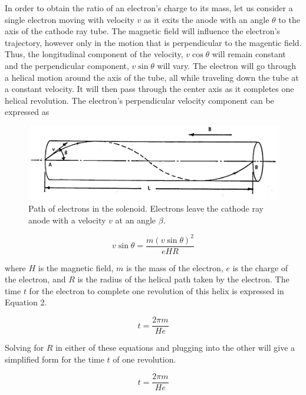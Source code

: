 \documentclass[%
 aip,
 amsmath,amssymb,
 reprint,%
floatfix,
]{revtex4-1}
\begin{document}
In order to obtain the ratio of an electron's charge to its mass, let us consider a single electron moving with velocity $v$ as it exits the anode with an angle $\theta$ to the axis of the cathode ray tube. The magnetic field will influence the electron's trajectory, however only in the motion that is perpendicular to the magentic field. Thus, the longitudinal component of the velocity, $v \cos{\theta}$ will remain constant and the perpendicular component, $v \sin{\theta}$ will vary. The electron will go through a helical motion around the axis of the tube, all while traveling down the tube at a constant velocity. It will then pass through the center axis as it completes one helical revolution. The electron's perpendicular velocity component can be expressed as

\begin{figure}[H]
		\centering
		\includegraphics[scale=0.5]{electrontrajectory.png}
		\caption{Path of electrons in the solenoid. Electrons leave the cathode ray anode with a velocity $v$ at an angle $\beta$.}
	\end{figure}

\begin{equation}
	v \sin{\theta} = \frac{m(v \sin{\theta})^2}{eHR}
\end{equation}
 
\noindent where $H$ is the magnetic field, $m$ is the mass of the electron, $e$ is the charge of the electron, and $R$ is the radius of the helical path taken by the electron. The time $t$ for the electron to complete one revolution of this helix is expressed in Equation 2.

\begin{equation}
	t = \frac{2 \pi m}{H e}
\end{equation}

\noindent Solving for $R$ in either of these equations and plugging into the other will give a simplified form for the time $t$ of one revolution.

\begin{equation}
	t = \frac{2 \pi m}{H e}
\end{equation}
\end{document}
